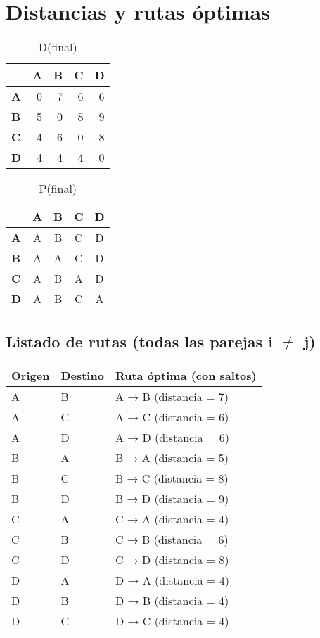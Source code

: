 \documentclass{article}
\begin{document}
\section*{Distancias y rutas óptimas}
\begin{table}[H]\centering
\caption{D(final)}
\begin{tabular}{l r r r r}
\toprule
 & \textbf{A} & \textbf{B} & \textbf{C} & \textbf{D}\\\midrule
\textbf{A} & 0 & 7 & 6 & 6 \\
\textbf{B} & 5 & 0 & 8 & 9 \\
\textbf{C} & 4 & 6 & 0 & 8 \\
\textbf{D} & 4 & 4 & 4 & 0 \\
\bottomrule
\end{tabular}
\end{table}

\begin{table}[H]\centering
\caption{P(final)}
\begin{tabular}{l c c c c}
\toprule
 & \textbf{A} & \textbf{B} & \textbf{C} & \textbf{D}\\\midrule
\textbf{A} & A & B & C & D \\
\textbf{B} & A & A & C & D \\
\textbf{C} & A & B & A & D \\
\textbf{D} & A & B & C & A \\
\bottomrule
\end{tabular}
\end{table}

\subsection*{Listado de rutas (todas las parejas i $\neq$ j)}
\begin{longtable}{llp{}}
\toprule
\textbf{Origen} & \textbf{Destino} & \textbf{Ruta óptima (con saltos)}\\\midrule
A & B & A → B (distancia = 7)\\
A & C & A → C (distancia = 6)\\
A & D & A → D (distancia = 6)\\
B & A & B → A (distancia = 5)\\
B & C & B → C (distancia = 8)\\
B & D & B → D (distancia = 9)\\
C & A & C → A (distancia = 4)\\
C & B & C → B (distancia = 6)\\
C & D & C → D (distancia = 8)\\
D & A & D → A (distancia = 4)\\
D & B & D → B (distancia = 4)\\
D & C & D → C (distancia = 4)\\
\bottomrule
\end{longtable}
\end{document}

